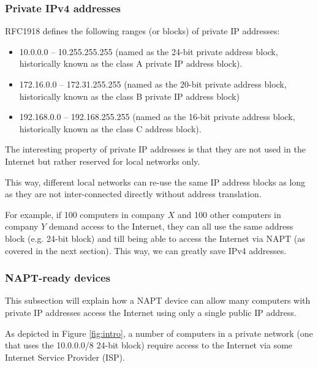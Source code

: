 \documentclass[pdftex,12pt,a4paper]{article}
\begin{document}
            \subsubsection{Private IPv4 addresses}
                RFC1918 defines the following ranges (or blocks) of private IP
                addresses:
                \begin{itemize}
                    \item 10.0.0.0 -- 10.255.255.255 (named as the 24-bit private
                        address block, historically known as the class A private IP
                        address block).
                    \item 172.16.0.0 -- 172.31.255.255 (named as the 20-bit private
                        address block, historically known as the class B private IP
                        address block)
                    \item 192.168.0.0 -- 192.168.255.255 (named as the 16-bit
                        private address block, historically known as the class C
                        address block).
                \end{itemize}

                The interesting property of private IP addresses is that they
                are not used in the Internet but rather reserved for local
                networks only.

                This way, different local networks can re-use the same IP
                address blocks as long as they are not inter-connected
                directly without address translation.

                For example, if 100 computers in company $X$ and 100 other
                computers in company $Y$ demand access to the Internet,
                they can all use the same address block (e.g. 24-bit block) and
                till being able to access the Internet via NAPT (as covered in
                the next section). This way, we can greatly save IPv4
                addresses.

            \subsubsection{NAPT-ready devices}
                This subsection will explain how a NAPT device can allow many
                computers with private IP addresses access the Internet using
                only a single public IP address.

                As depicted in Figure \ref{fig:intro}, a number of computers in
                a private network (one that uses the 10.0.0.0/8 24-bit block) require
                access to the Internet via some Internet  Service Provider
                (ISP).
                
\end{document}
